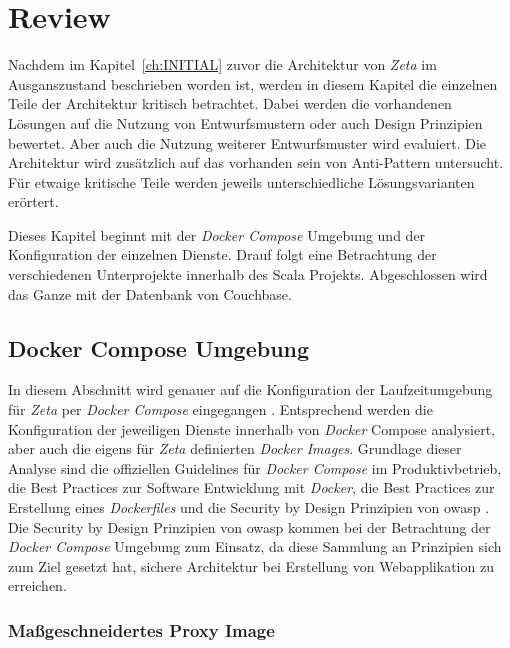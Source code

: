 \chapter{Review}
\label{ch:REVIEW}

Nachdem im Kapitel~\ref{ch:INITIAL} zuvor die Architektur von \textit{Zeta} im Ausganszustand beschrieben worden ist, werden in diesem Kapitel die einzelnen Teile der Architektur kritisch betrachtet. Dabei werden die vorhandenen Lösungen auf die Nutzung von Entwurfsmustern oder auch Design Prinzipien bewertet. Aber auch die Nutzung weiterer Entwurfsmuster wird evaluiert. Die Architektur wird zusätzlich auf das vorhanden sein von Anti-Pattern untersucht. Für etwaige kritische Teile werden jeweils unterschiedliche Lösungsvarianten erörtert.

Dieses Kapitel beginnt mit der \textit{Docker Compose} Umgebung und der Konfiguration der einzelnen Dienste. Drauf folgt eine Betrachtung der verschiedenen Unterprojekte innerhalb des Scala Projekts. Abgeschlossen wird das Ganze mit der Datenbank von Couchbase.

\section{Docker Compose Umgebung}

In diesem Abschnitt wird genauer auf die Konfiguration der Laufzeitumgebung für \textit{Zeta} per \textit{Docker Compose} eingegangen \cite{zeta_docker_compose}. Entsprechend werden die Konfiguration der jeweiligen Dienste innerhalb von \textit{Docker} Compose analysiert, aber auch die eigens für \textit{Zeta} definierten \textit{Docker Images}. Grundlage dieser Analyse sind die offiziellen Guidelines für \textit{Docker Compose} im Produktivbetrieb, die Best Practices zur Software Entwicklung mit \textit{Docker}, die Best Practices zur Erstellung eines \textit{Dockerfiles} und die Security by Design Prinzipien von \ac{owasp} \cite{docker_best_practices,docker_compose_production,dockerfile_best_practices,owasp_security_by_design}. Die Security by Design Prinzipien von \ac{owasp} kommen bei der Betrachtung der \textit{Docker Compose} Umgebung zum Einsatz, da diese Sammlung an Prinzipien sich zum Ziel gesetzt hat, sichere Architektur bei Erstellung von Webapplikation zu erreichen.

\subsection{Maßgeschneidertes Proxy Image}

